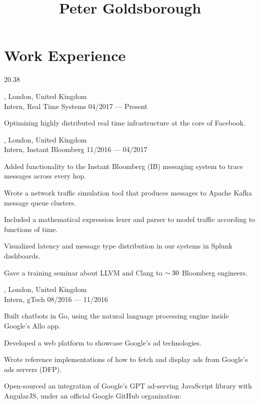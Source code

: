 




\begin{header}
	\title{Peter Goldsborough}
	\separate
	\separate
\end{header}

\section{Work Experience}{2}{0.38}

\begin{entry}
	{, London, United Kingdom}
	{\\Intern, Real Time Systems}
	{04/2017 --- Present}
	\item Optimizing highly distributed real time infrastructure at the core of Facebook.
\end{entry}

\begin{entry}
	{, London, United Kingdom}
	{\\Intern, Instant Bloomberg}
	{11/2016 --- 04/2017}
  \item Added functionality to the Instant Bloomberg (IB) messaging system to trace messages across every hop.
  \item Wrote a network traffic simulation tool that produces messages to Apache Kafka message queue clusters.
  \item Included a mathematical expression lexer and parser to model traffic according to functions of time.
  \item Visualized latency and message type distribution in our systems in Splunk dashboards.
  \item Gave a training seminar about LLVM and Clang to $\small\sim 30$ Bloomberg engineers.
\end{entry}

\begin{entry}
	{, London, United Kingdom}
	{\\Intern, gTech}
	{08/2016 --- 11/2016}
  \item Built chatbots in Go, using the natural language processing engine inside Google's Allo app.
  \item Developed a web platform to showcase Google's ad technologies.
  \item Wrote reference implementations of how to fetch and display ads from Google’s ads servers (DFP).
  \item Open-sourced an integration of Google’s GPT ad-serving JavaScript library with AngularJS, under an official Google GitHub organization: 
\end{entry}

